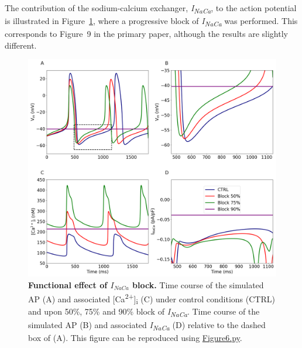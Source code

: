 \documentclass[fleqn,10pt]{physiome}
\begin{document}
The contribution of the sodium-calcium exchanger, \textit{I\textsubscript{NaCa}}, to the action potential is illustrated in Figure~\ref{Figure6}, where a progressive block of \textit{I\textsubscript{NaCa}} was performed. This corresponds to Figure~9 in the primary paper, although the results are slightly different.\newpage

\begin{figure}[htbp]
\centering
\includegraphics[width=0.95\linewidth]{Figure6}
\caption{\textbf{Functional effect of $I_{NaCa}$ block.}\newline
Time course of the simulated AP (A) and associated [Ca\textsuperscript{2+}]\textsubscript{i} (C) under control conditions (CTRL) and upon 50\%, 75\% and 90\% block of \textit{I\textsubscript{NaCa}}. Time course of the simulated AP (B) and associated \textit{I\textsubscript{NaCa}} (D) relative to the dashed box of (A). This figure can be reproduced using \href{https://models.physiomeproject.org/workspace/648/rawfile/6784d6c3256c832dc98b2db42c85747ae2596518/Figure6.py}{Figure6.py}.}
\label{Figure6}
\end{figure}
\end{document}

